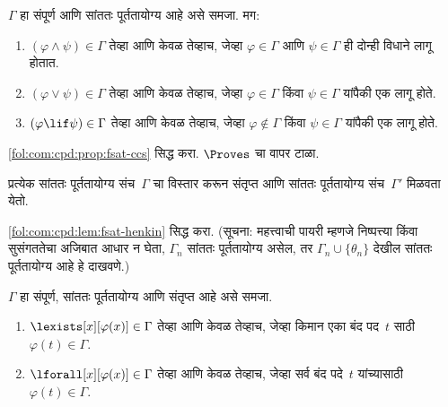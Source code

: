 \begin{prop}
\label{fol:com:cpd:prop:fsat-ccs}
$\Gamma$ हा संपूर्ण आणि सांततः पूर्ततायोग्य आहे असे समजा. मग:
\begin{enumerate}
\item $(\varphi \land \psi) \in \Gamma$
  तेव्हा आणि केवळ तेव्हाच, जेव्हा $\varphi \in \Gamma$ आणि $\psi \in \Gamma$
  ही दोन्ही विधाने लागू होतात.

\item $(\varphi \lor \psi) \in \Gamma$ तेव्हा आणि केवळ तेव्हाच,
  जेव्हा $\varphi \in \Gamma$ किंवा $\psi \in \Gamma$ यांपैकी एक लागू होते.

\item $(\varphi \lif \psi) \in \Gamma$ तेव्हा आणि केवळ तेव्हाच,
  जेव्हा $\varphi \notin \Gamma$ किंवा $\psi \in \Gamma$ यांपैकी एक लागू होते.
\end{enumerate}
\end{prop}


\begin{prob}
\ref{fol:com:cpd:prop:fsat-ccs} सिद्ध करा. $\Proves$ चा वापर टाळा.
\end{prob}





\begin{lem}
\label{fol:com:cpd:lem:fsat-henkin} प्रत्येक सांततः पूर्ततायोग्य संच~$\Gamma$ चा
विस्तार करून संतृप्त आणि सांततः पूर्ततायोग्य संच~$\Gamma'$ मिळवता येतो.
\end{lem}



\begin{prob}
\ref{fol:com:cpd:lem:fsat-henkin} सिद्ध करा. (सूचना: महत्त्वाची
पायरी म्हणजे निष्पत्त्या किंवा सुसंगततेचा अजिबात आधार न घेता,
$\Gamma_n$ सांततः पूर्ततायोग्य असेल, तर $\Gamma_n \cup \{\theta_n\}$
देखील सांततः पूर्ततायोग्य आहे हे दाखवणे.)
\end{prob}



\begin{prop}\label{fol:com:cpd:prop:fsat-instances}
$\Gamma$ हा संपूर्ण, सांततः पूर्ततायोग्य आणि संतृप्त आहे असे समजा.
\begin{enumerate}
\item $\lexists[x][\varphi(x)] \in \Gamma$ तेव्हा आणि केवळ तेव्हाच,
  जेव्हा किमान एका बंद पद~$t$ साठी $\varphi(t) \in \Gamma$.
\item $\lforall[x][\varphi(x)] \in \Gamma$ तेव्हा आणि केवळ तेव्हाच,
  जेव्हा सर्व बंद पदे~$t$ यांच्यासाठी $\varphi(t) \in \Gamma$.
\end{enumerate}
\end{prop}



